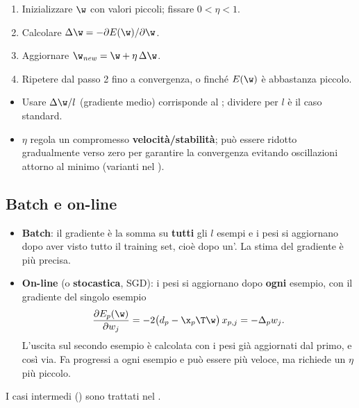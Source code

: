 \begin{algoritmo}
\begin{enumerate}
  \item Inizializzare $\w$ con valori piccoli; fissare $0<\eta<1$.
  \item Calcolare $\Delta\w = -\partial E(\w)/\partial\w$.
  \item Aggiornare $\w_{\mathit{new}} = \w + \eta\,\Delta\w$.
  \item Ripetere dal passo 2 fino a convergenza, o finché $E(\w)$ è abbastanza piccolo.
\end{enumerate}
\end{algoritmo}

\begin{itemize}
  \item Usare $\Delta\w/l$ (gradiente medio) corrisponde al ; dividere per $l$ è il caso
        standard.
  \item $\eta$ regola un compromesso \textbf{velocità/stabilità}; può essere ridotto gradualmente verso zero per
        garantire la convergenza evitando oscillazioni attorno al minimo (varianti nel ).
\end{itemize}

\subsection{Batch e on-line}
\label{sec:batch-online}

\begin{itemize}
  \item \textbf{Batch}: il gradiente è la somma su \textbf{tutti} gli $l$ esempi e i pesi si aggiornano dopo aver
        visto tutto il training set, cioè dopo un'. La stima del gradiente è più precisa.
  \item \textbf{On-line} (o \textbf{stocastica}, SGD): i pesi si aggiornano dopo \textbf{ogni} esempio, con il
        gradiente del singolo esempio
        \[
        \frac{\partial E_p(\w)}{\partial w_j} = -2\big(d_p-\x_p\T\w\big)\,x_{p,j} = -\Delta_pw_j .
        \]
        L'uscita sul secondo esempio è calcolata con i pesi già aggiornati dal primo, e così via. Fa progressi a
        ogni esempio e può essere più veloce, ma richiede un $\eta$ più piccolo.
\end{itemize}
I casi intermedi () sono trattati nel .

